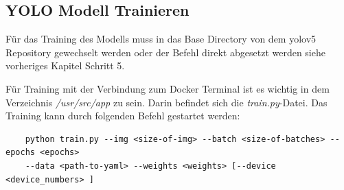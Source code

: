\subsection{YOLO Modell Trainieren}
\label{sec:yolo_train}

Für das Training des Modells muss in das  Base Directory von dem \ac{yolo}v5 Repository gewechselt werden oder der Befehl direkt abgesetzt werden siehe vorheriges Kapitel Schritt 5.

Für Training mit der Verbindung zum Docker Terminal ist es wichtig in dem Verzeichnis \textit{/usr/src/app} zu sein. Darin befindet sich die \textit{train.py}-Datei. Das Training kann durch folgenden Befehl gestartet werden:
\begin{verbatim}
    python train.py --img <size-of-img> --batch <size-of-batches> --epochs <epochs>
    --data <path-to-yaml> --weights <weights> [--device <device_numbers> ]
\end{verbatim}

